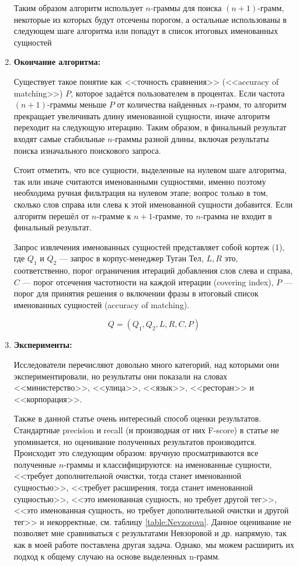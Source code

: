 \begin{enumerate}
Таким образом алгоритм использует $n$-граммы для поиска $(n+1)$-грамм, некоторые из которых будут отсечены порогом, а остальные использованы в следующем шаге алгоритма или попадут в список итоговых именованных сущностей

\item\textbf{Окончание алгоритма:}

Существует такое понятие как <<точность сравнения>> (<<accuracy of matching>>) $P$, которое задаётся пользователем в процентах. Если частота $(n+1)$-граммы меньше $P$ от количества найденных $n$-грамм, то алгоритм прекращает увеличивать длину именованной сущности, иначе алгоритм переходит на следующую итерацию. Таким образом, в финальный результат входят самые стабильные $n$-граммы разной длины, включая результаты поиска изначального поискового запроса.

Стоит отметить, что все сущности, выделенные на нулевом шаге алгоритма, так или иначе считаются именованными сущностями, именно поэтому необходима ручная фильтрация на нулевом этапе; вопрос только в том, сколько слов справа или слева к этой именованной сущности добавится. Если алгоритм перешёл от $n$-грамме к $n+1$-грамме, то $n$-грамма не входит в финальный результат.

Запрос извлечения именованных сущностей представляет собой кортеж (1), где $Q_1$ и $Q_2$ --- запрос в корпус-менеджер Туган Тел\cite{tugan_tel}, $L, R$ это, соответственно, порог ограничения итераций добавления слов слева и справа, $C$ --- порог отсечения частотности на каждой итерации (covering index), $P$ --- порог для принятия решения о включении фразы в итоговый список именованных сущностей (accuracy of matching).

\[Q = (Q_1, Q_2, L, R, C, P)\]

\item\textbf{Эксперименты:}

Исследователи перечисляют довольно много категорий, над которыми они экспериментировали, но результаты они показали на словах <<министерство>>, <<улица>>, <<язык>>, <<ресторан>> и <<корпорация>>.

Также в данной статье очень интересный способ оценки результатов. Стандартные precision и recall (и производная от них F-score) в статье не упоминается, но оценивание полученных результатов производится. Происходит это следующим образом: вручную просматриваются все полученные $n$-граммы и классифицируются: на именованные сущности, <<требует дополнительной очистки, тогда станет именованной сущностью>>, <<требует расширения, тогда станет именованной сущностью>>, <<это именованная сущность, но требует другой тег>>,  <<это именованная сущность, но требует дополнительной очистки и другой тег>> и некорректные, см. таблицу \ref{table:Nevzorova}. Данное оценивание не позволяет мне сравниваться с результатами Невзоровой и др. напрямую, так как в моей работе поставлена другая задача. Однако, мы можем расширить их подход к общему случаю на основе выделенных n-грамм.

\end{enumerate}


